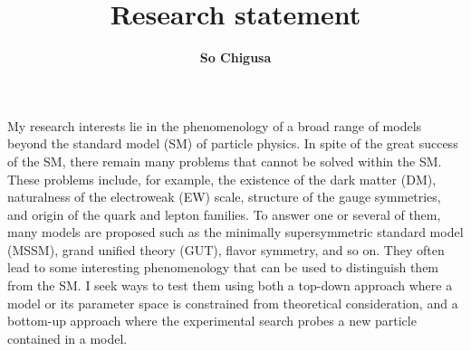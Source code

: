 \documentclass[12pt,notitlepage]{article}
\title{\vspace*{-3cm}Research statement}
\author{\textbf{So Chigusa}}
\date{}
\begin{document}
\maketitle\thispagestyle{empty}

My research interests lie in the phenomenology of a broad range of models beyond the standard model (SM) of particle physics.
In spite of the great success of the SM, there remain many problems that cannot be solved within the SM.
These problems include, for example, the existence of the dark matter (DM), naturalness of the electroweak (EW) scale, structure of the gauge symmetries, and origin of the quark and lepton families.
To answer one or several of them, many models are proposed such as the minimally supersymmetric standard model (MSSM), grand unified theory (GUT), flavor symmetry, and so on.
They often lead to some interesting phenomenology that can be used to distinguish them from the SM.
I seek ways to test them using both a top-down approach where a model or its parameter space is constrained from theoretical consideration, and a bottom-up approach where the experimental search probes a new particle contained in a model.


\end{document}

